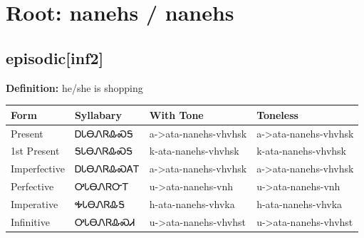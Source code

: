 \documentclass{article}%
\begin{document}
%
\normalsize%
\section*{Root: nanehs / nanehs}%
\subsection*{episodic[inf2]}%
\textbf{Definition: }%
he/she is shopping%
\\[0.5em]%
\begin{tabular}{|l|l|l|l|}%
\hline%
\textbf{Form}&\textbf{Syllabary}&\textbf{With Tone}&\textbf{Toneless}\\%
\hline%
Present&ᎠᏓᎾᏁᏒᎲᏍᎦ&a{-}>ata{-}nanehs{-}vhvhsk&a{-}>ata{-}nanehs{-}vhvhsk\\%
1st Present&ᎦᏓᎾᏁᏒᎲᏍᎦ&k{-}ata{-}nanehs{-}vhvhsk&k{-}ata{-}nanehs{-}vhvhsk\\%
Imperfective&ᎠᏓᎾᏁᏒᎲᏍᎪᎢ&a{-}>ata{-}nanehs{-}vhvhsk&a{-}>ata{-}nanehs{-}vhvhsk\\%
Perfective&ᎤᏓᎾᏁᏒᏅᎢ&u{-}>ata{-}nanehs{-}vnh&u{-}>ata{-}nanehs{-}vnh\\%
Imperative&ᎭᏓᎾᏁᏒᎲᎦ&h{-}ata{-}nanehs{-}vhvka&h{-}ata{-}nanehs{-}vhvka\\%
Infinitive&ᎤᏓᎾᏁᏒᎲᏍᏗ&u{-}>ata{-}nanehs{-}vhvhst&u{-}>ata{-}nanehs{-}vhvhst\\%
\hline%
\end{tabular}%
\\[1em]%
\end{document}

